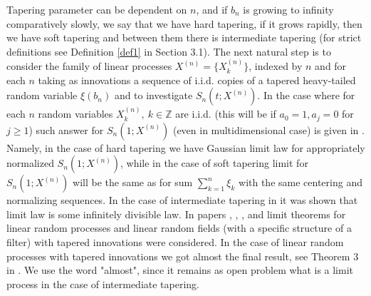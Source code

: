\documentclass[12pt]{article}
\def\bz{{\bf Z}}
\def\bz{{\mathbb Z}} %
\theoremstyle{plain}
\theoremstyle{definition}
\begin{document}
Tapering parameter can be dependent on $n$, and if $b_n$ is growing to infinity comparatively slowly, we say that we have hard tapering, if it grows rapidly, then we have soft tapering and between them there is intermediate tapering  (for strict definitions see Definition \ref{def1} in Section 3.1). The next natural step is to consider the family of linear processes $X^{(n)}=\{X_k^{(n)}\}$, indexed by $n$ and for each $n$ taking as innovations a sequence of i.i.d.  copies of a tapered heavy-tailed random variable $\xi(b_n)$ and to investigate  $S_{n}(t; X^{(n)})$. In the case where for each $n$ random variables $X_k^{(n)}, \ k\in \bz $ are i.i.d. (this will be if $a_0=1, a_j=0$ for $j\ge 1$) such answer for $S_{n}(1; X^{(n)})$ (even in multidimensional case) is given in \cite{Chakrabarty}. Namely, in the case of hard tapering we have Gaussian limit law for appropriately normalized $S_{n}(1; X^{(n)})$, while in the case of soft tapering limit for $S_{n}(1; X^{(n)})$ will be the same as for sum $\sum_{k=1}^{n} \xi_{k}$ with the same centering and normalizing sequences. In the case  of intermediate tapering in \cite{Chakrabarty} it was shown that limit law is some infinitely divisible law.
In papers \cite{Paul21}, \cite{Paul23}, \cite{Paul22}, and \cite{PaulDam5} limit theorems for linear random processes and linear random fields (with a specific structure of a filter) with tapered innovations were considered. In the case of linear random processes with tapered innovations we got   almost the final result, see Theorem 3 in \cite{PaulDam5}. We use the word "almost", since it remains  as open problem  what is a limit process in the case of intermediate tapering.
\end{document}
